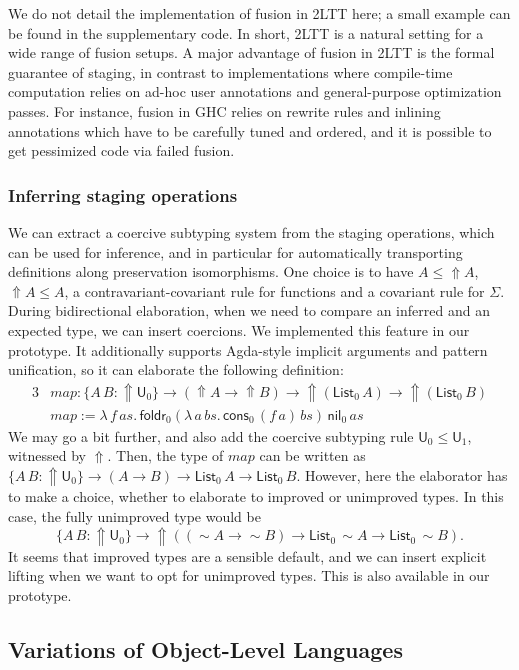 \documentclass[acmsmall,review]{acmart}
\newcommand{\mit}[1]{\mathit{#1}}
\newcommand{\msf}[1]{\mathsf{#1}}
\newcommand{\Lift}{{\Uparrow}}
\newcommand{\spl}{{\sim}}
\renewcommand{\U}{\msf{U}}
\newcommand{\List}{\msf{List}}
\newcommand{\nil}{\msf{nil}}
\newcommand{\cons}{\msf{cons}}
\theoremstyle{remark}
\begin{document}
We do not detail the implementation of fusion in 2LTT here; a small example can
be found in the supplementary code. In short, 2LTT is a natural setting for a
wide range of fusion setups. A major advantage of fusion in 2LTT is the formal
guarantee of staging, in contrast to implementations where compile-time
computation relies on ad-hoc user annotations and general-purpose optimization
passes. For instance, fusion in GHC relies on rewrite rules and inlining
annotations which have to be carefully tuned and ordered, and it is possible to
get pessimized code via failed fusion.

\subsubsection{Inferring staging operations}
We can extract a coercive subtyping system from the staging operations, which
can be used for inference, and in particular for automatically transporting
definitions along preservation isomorphisms. One choice is to have $A \leq \Lift
A$, $\Lift A \leq A$, a contravariant-covariant rule for functions and a
covariant rule for $\Sigma$. During bidirectional elaboration, when we need to
compare an inferred and an expected type, we can insert coercions.  We
implemented this feature in our prototype. It additionally supports Agda-style
implicit arguments and pattern unification, so it can elaborate the following
definition:
\begin{alignat*}{3}
  & \mit{map} : \{A\,B : \Lift\U_0\} \to (\Lift A \to \Lift B)
      \to \Lift(\List_0\,A) \to \Lift(\List_0\,B)\\
  & \mit{map} := \lambda\,f\,\mit{as}.\,
      \msf{foldr}_0
        (\lambda\,a\,\mit{bs}.\, \cons_0\,(f\,a)\,\mit{bs})\,
        \nil_0\,
        as
\end{alignat*}
We may go a bit further, and also add the coercive subtyping rule $\U_0 \leq
\U_1$, witnessed by $\Lift$. Then, the type of $\mit{map}$ can be written as
$\{A\,B : \Lift\U_0\} \to (A \to B) \to \List_0\,A \to \List_0\,B$. However,
here the elaborator has to make a choice, whether to elaborate to improved or
unimproved types. In this case, the fully unimproved type would be
\[ \{A\,B : \Lift\U_0\} \to \Lift((\spl A \to \spl B) \to \List_0\,\spl A \to \List_0\,\spl B). \]
It seems that improved types are a sensible default, and we can insert explicit
lifting when we want to opt for unimproved types. This is also available in our
prototype.

\subsection{Variations of Object-Level Languages}
\label{sec:variations}
\end{document}
